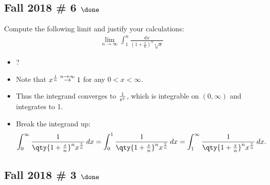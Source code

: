 \hypertarget{fall-2018-6-done}{%
\subsection{\texorpdfstring{Fall 2018 \# 6
\(\done\)}{Fall 2018 \# 6 \textbackslash done}}\label{fall-2018-6-done}}

Compute the following limit and justify your calculations:
\begin{align*}
\lim_{n \rightarrow \infty} \int_{1}^{n} \frac{d x}{\left(1+\frac{x}{n}\right)^{n} \sqrt[n]{x}}
\end{align*}


\begin{solution}

\hfill

\begin{concept}

\hfill

\begin{itemize}
\tightlist
\item
  ?
\end{itemize}

\end{concept}

\begin{itemize}
\tightlist
\item
  Note that \(x^{1\over n} \overset{n\to\infty}\to 1\) for any
  \(0 < x < \infty\).
\item
  Thus the integrand converges to \({1\over e^x}\), which is integrable
  on \((0, \infty)\) and integrates to 1.
\item
  Break the integrand up:
  \begin{align*}
  \int_0^\infty {1 \over  \qty{ 1 + {x\over n} }^n x^{1\over n}} \,dx
  = \int_0^1 {1 \over  \qty{ 1 + {x\over n} }^n x^{1\over n}} \,dx
  = \int_1^\infty {1 \over  \qty{ 1 + {x\over n} }^n x^{1\over n}} \,dx
  .\end{align*}
\end{itemize}

\end{solution}

\hypertarget{fall-2018-3-done}{%
\subsection{\texorpdfstring{Fall 2018 \# 3
\(\done\)}{Fall 2018 \# 3 \textbackslash done}}\label{fall-2018-3-done}}

